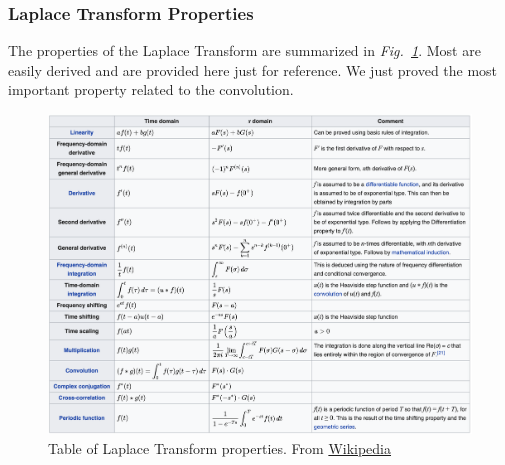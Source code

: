 \subsubsection{Laplace Transform Properties}
The properties of the Laplace Transform are summarized in \emph{Fig.~\ref{fig:laplace_table}}.   Most are easily derived and are provided here just for reference.  We just proved the most important property related to the convolution.    
\begin{figure}[tb]
\centering
\includegraphics[width=.9\columnwidth]{laplace_table.png}
\caption{Table of Laplace Transform properties.  From \href{https://en.Wikipedia.org/wiki/Laplace_transform}{Wikipedia}}
\label{fig:laplace_table}
\end{figure}
